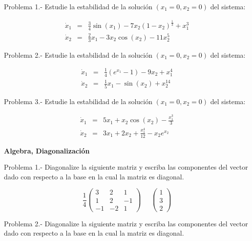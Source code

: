 \documentclass{article}
\begin{document}
Problema 1.- Estudie la estabilidad de la soluci\'on $(x_1=0,x_2=0)$ del sistema:

\begin{eqnarray}
  \dot{x}_1 &=& \frac{3}{4}\sin({x_1}) - 7x_2(1-x_2)^{\frac{1}{3}} + x_1^3 \nonumber \\
  \dot{x}_2 &=& \frac{2}{3}x_1 - 3x_2 \cos(x_2) -11x_2^5
\end{eqnarray}

Problema 2.- Estudie la estabilidad de la soluci\'on $(x_1=0,x_2=0)$ del sistema:

\begin{eqnarray}
  \dot{x}_1 &=& \frac{1}{4}(e^{x_1}-1) -9x_2 + x_1^4 \nonumber \\
  \dot{x}_2 &=& \frac{1}{5}x_1 - \sin(x_2) + x_2^{14}
\end{eqnarray}

Problema 3.- Estudie la estabilidad de la soluci\'on $(x_1=0,x_2=0)$ del sistema:

\begin{eqnarray}
  \dot{x}_1 &=& 5x_1 + x_2 \cos(x_2) - \frac{x_1^3}{3} \nonumber \\
  \dot{x}_2 &=& 3x_1 + 2x_2 + \frac{x_1^4}{12}  - x_2e^{x_2}
\end{eqnarray}

\newpage

\begin{center}
 \textbf{Algebra, Diagonalizaci\'on}
\end{center}
\vspace{1cm}

Problema 1.- Diagonalize la siguiente matriz y escriba las componentes
del vector dado con respecto a la base en la cual la matriz es diagonal.

\begin{equation}
  \frac{1}{4}\left( 
    \begin{array}{ccc}
         3 & 2 & 1 \nonumber \\
         1 & 2 & -1 \nonumber \\
         -1 & -2 & 1 
    \end{array}
    \right)
    \;\;\;\;\;
    \left( 
    \begin{array}{c}
          1  \nonumber \\
          3  \nonumber \\
          2  
    \end{array}
    \right)
\end{equation}


Problema 2.- Diagonalize la siguiente matriz y escriba las componentes
del vector dado con respecto a la base en la cual la matriz es diagonal.
\end{document}
